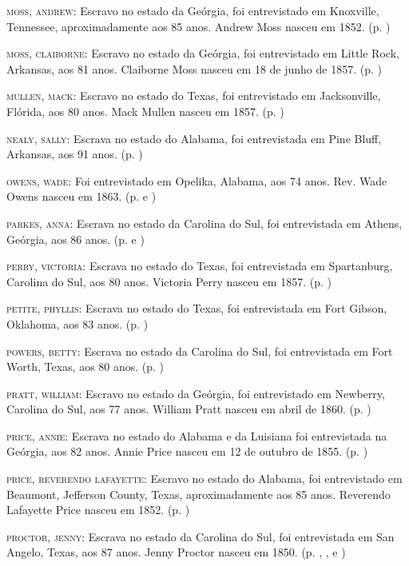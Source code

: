 \begin{Parskip}
\textsc{moss, andrew:} Escravo no estado da Geórgia, foi entrevistado em
Knoxville, Tennessee, aproximadamente aos 85 anos. Andrew Moss nasceu em
1852. (p. \pageref{ref202})

\textsc{moss, claiborne:} Escravo no estado da Geórgia, foi entrevistado
em Little Rock, Arkansas, aos 81 anos. Claiborne Moss nasceu em 18 de
junho de 1857. (p. \pageref{ref203})

\textsc{mullen, mack:} Escravo no estado do Texas, foi entrevistado em
Jacksonville, Flórida, aos 80 anos. Mack Mullen nasceu em 1857. (p. \pageref{ref204})

\textsc{nealy, sally:} Escrava no estado do Alabama, foi entrevistada em
Pine Bluff, Arkansas, aos 91 anos. (p. \pageref{ref205})

\textsc{owens, wade:} Foi entrevistado em Opelika, Alabama, aos 74 anos.
Rev. Wade Owens nasceu em 1863. (p. \pageref{ref206} e \pageref{ref207})

\textsc{parkes, anna:} Escrava no estado da Carolina do Sul, foi
entrevistada em Athens, Geórgia, aos 86 anos. (p. \pageref{ref208} e \pageref{ref209})

\textsc{perry, victoria:} Escrava no estado do Texas, foi entrevistada
em Spartanburg, Carolina do Sul, aos 80 anos. Victoria Perry nasceu em
1857. (p. \pageref{ref210})

\textsc{petite, phyllis:} Escrava no estado do Texas, foi entrevistada
em Fort Gibson, Oklahoma, aos 83 anos. (p. \pageref{ref211})

\textsc{powers, betty:} Escrava no estado da Carolina do Sul, foi
entrevistada em Fort Worth, Texas, aos 80 anos. (p. \pageref{ref212})

\textsc{pratt, william:} Escravo no estado da Geórgia, foi entrevistado
em Newberry, Carolina do Sul, aos 77 anos. William Pratt nasceu em abril
de 1860. (p. \pageref{ref213})

\textsc{price, annie:} Escrava no estado do Alabama e da Luisiana foi
entrevistada na Geórgia, aos 82 anos. Annie Price nasceu em 12 de
outubro de 1855. (p. \pageref{ref214})

\textsc{price, reverendo lafayette:} Escravo no estado do Alabama, foi
entrevistado em Beaumont, Jefferson County, Texas, aproximadamente aos
85 anos. Reverendo Lafayette Price nasceu em 1852. (p. \pageref{ref215})

\textsc{proctor, jenny:} Escrava no estado da Carolina do Sul, foi
entrevistada em San Angelo, Texas, aos 87 anos. Jenny Proctor nasceu em
1850. (p. \pageref{ref216}, \pageref{ref217}, \pageref{ref218} e \pageref{ref219})


\end{Parskip}
